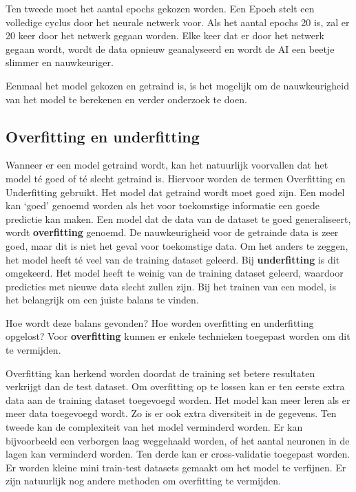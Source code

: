 Ten tweede moet het aantal epochs gekozen worden. Een \gls{Epoch} stelt een volledige cyclus door het neurale netwerk voor. Als het aantal epochs 20 is, zal er 20 keer door het netwerk gegaan worden. Elke keer dat er door het netwerk gegaan wordt, wordt de data opnieuw geanalyseerd en wordt de AI een beetje slimmer en nauwkeuriger.

Eenmaal het model gekozen en getraind is, is het mogelijk om de nauwkeurigheid van het model te berekenen en verder onderzoek te doen. 

\subsection{Overfitting en underfitting}
\label{sec:overunderfitting}

Wanneer er een model getraind wordt, kan het natuurlijk voorvallen dat het model té goed of té slecht getraind is. Hiervoor worden de termen \gls{Overfitting} en \gls{Underfitting} gebruikt. Het model dat getraind wordt moet goed zijn. Een model kan ‘goed’ genoemd worden als het voor toekomstige informatie een goede predictie kan maken. Een model dat de data van de dataset te goed generaliseert, wordt \textbf{overfitting} genoemd. De nauwkeurigheid voor de getrainde data is zeer goed, maar dit is niet het geval voor toekomstige data. Om het anders te zeggen, het model heeft té veel van de training dataset geleerd. Bij \textbf{underfitting} is dit omgekeerd. Het model heeft te weinig van de training dataset geleerd, waardoor predicties met nieuwe data slecht zullen zijn. Bij het trainen van een model, is het belangrijk om een juiste balans te vinden. \autocite{AlMasri2019}

Hoe wordt deze balans gevonden? Hoe worden overfitting en underfitting opgelost? 
Voor \textbf{overfitting} kunnen er enkele technieken toegepast worden om dit te vermijden. 

Overfitting kan herkend worden doordat de training set betere resultaten verkrijgt dan de test dataset. Om overfitting op te lossen kan er ten eerste extra data aan de training dataset toegevoegd worden. Het model kan meer leren als er meer data toegevoegd wordt. Zo is er ook extra diversiteit in de gegevens. Ten tweede kan de complexiteit van het model verminderd worden. Er kan bijvoorbeeld een verborgen laag weggehaald worden, of het aantal neuronen in de lagen kan verminderd worden. Ten derde kan er cross-validatie toegepast worden. Er worden kleine mini train-test datasets gemaakt om het model te verfijnen. Er zijn natuurlijk nog andere methoden om overfitting te vermijden. \autocite{Datascience2021}

